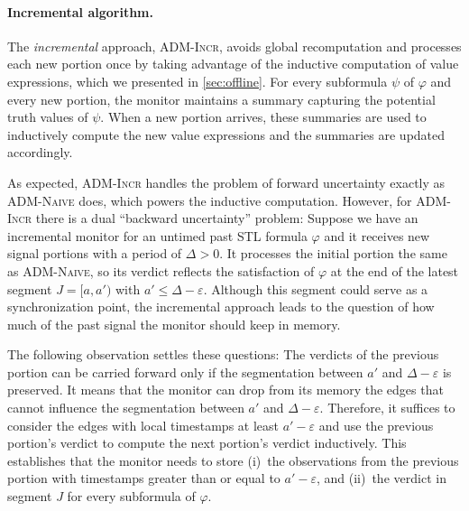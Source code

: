 \paragraph*{Incremental algorithm.}
The \emph{incremental} approach, \textsc{ADM-Incr}, avoids global recomputation and processes each new portion once by taking advantage of the inductive computation of value expressions, which we presented in \cref{sec:offline}.
For every subformula $\psi$ of $\varphi$ and every new portion, the monitor maintains a summary capturing the potential truth values of $\psi$.
When a new portion arrives, these summaries are used to inductively compute the new value expressions and the summaries are updated accordingly.

As expected, \textsc{ADM-Incr} handles the problem of forward uncertainty exactly as \textsc{ADM-Naive} does, which powers the inductive computation.
However, for \textsc{ADM-Incr} there is a dual ``backward uncertainty'' problem:
Suppose we have an incremental monitor for an untimed past STL formula $\varphi$ and it receives new signal portions with a period of $\Delta > 0$.
It processes the initial portion the same as \textsc{ADM-Naive}, so its verdict reflects the satisfaction of $\varphi$ at the end of the latest segment $J = [a, a')$ with $a' \leq \Delta - \varepsilon$.
Although this segment could serve as a synchronization point, the incremental approach leads to the question of how much of the past signal the monitor should keep in memory.

The following observation settles these questions:
The verdicts of the previous portion can be carried forward only if the segmentation between $a'$ and $\Delta - \varepsilon$ is preserved.
It means that the monitor can drop from its memory the edges that cannot influence the segmentation between $a'$ and $\Delta - \varepsilon$.
Therefore, it suffices to consider the edges with local timestamps at least $a' - \varepsilon$ and use the previous portion's verdict to compute the next portion's verdict inductively.
This establishes that the monitor needs to store (i)~the observations from the previous portion with timestamps greater than or equal to $a' - \varepsilon$, and (ii)~the verdict in segment $J$ for every subformula of $\varphi$.

